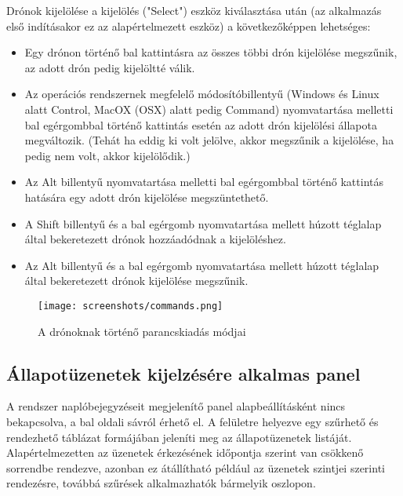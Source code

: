 Drónok kijelölése a kijelölés ("Select") eszköz kiválasztása után (az alkalmazás
első indításakor ez az alapértelmezett eszköz) a következőképpen lehetséges:
\begin{itemize}

  \item Egy drónon történő bal kattintásra az összes többi drón kijelölése
  megszűnik, az adott drón pedig kijelöltté válik.

  \item Az operációs rendszernek megfelelő módosítóbillentyű (Windows és Linux
  alatt Control, MacOX (OSX) alatt pedig Command) nyomvatartása melletti bal
  egérgombbal történő kattintás esetén az adott drón kijelölési állapota
  megváltozik. (Tehát ha eddig ki volt jelölve, akkor megszűnik a kijelölése, ha
  pedig nem volt, akkor kijelölődik.)

  \item Az Alt billentyű nyomvatartása melletti bal egérgombbal történő
  kattintás hatására egy adott drón kijelölése megszüntethető.

  \item A Shift billentyű és a bal egérgomb nyomvatartása mellett húzott
  téglalap által bekeretezett drónok hozzáadódnak a kijelöléshez.

  \item Az Alt billentyű és a bal egérgomb nyomvatartása mellett húzott
  téglalap által bekeretezett drónok kijelölése megszűnik.

\end{itemize}

\begin{figure}[H]
  \texttt{[image: screenshots/commands.png]}
  \caption{A drónoknak történő parancskiadás módjai}
  \label{fig:commands}
\end{figure}


\subsection{Állapotüzenetek kijelzésére alkalmas panel}

A rendszer naplóbejegyzéseit megjelenítő panel alapbeállításként nincs
bekapcsolva, a bal oldali sávról érhető el. A felületre helyezve egy szűrhető
és rendezhető táblázat formájában jeleníti meg az állapotüzenetek listáját.
Alapértelmezetten az üzenetek érkezésének időpontja szerint van csökkenő
sorrendbe rendezve, azonban ez átállítható például az üzenetek szintjei szerinti
rendezésre, továbbá szűrések alkalmazhatók bármelyik oszlopon.

